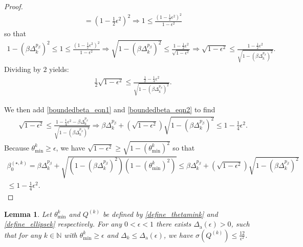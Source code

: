 \documentclass{article}
\newtheorem{lemma}[theorem]{Lemma}
\theoremstyle{case}
\numberwithin{theorem}{subsection}
\newcommand{\bsk}{{\beta_0^{(\star, k)}}}
\newcommand{\dacco}{{\Delta_{\textrm{a}}}}
\newcommand{\dk}{\Delta_k}
\newcommand{\naturals}{\mathbb N}
\newcommand{\qk}{{Q^{(k)}}}
\newcommand{\thetamink}{{\theta^k_{\textrm{min}}}}
\begin{document}
\begin{proof}
\begin{align*}
= \left(1 - \frac 1 2 \epsilon^2 \right)^2 
\Longrightarrow 1 \le \frac{\left(1 - \frac 1 2 \epsilon^2\right)^2}{1 - \epsilon^2}
\end{align*}
so that
\begin{align*}
1 - \left(\beta\dk^{p_{\beta}}\right)^2 \le 1 \le \frac{\left(1 - \frac 1 2 \epsilon^2\right)^2}{1 - \epsilon^2} 
\Longrightarrow \sqrt{1 - \left(\beta\dk^{p_{\beta}}\right)^2}\le \frac{1 - \frac 1 2 \epsilon^2}{\sqrt{1 - \epsilon^2} } 
\Longrightarrow \sqrt{1 - \epsilon^2} \le \frac{1 - \frac 1 2 \epsilon^2}{\sqrt{1 - \left(\beta\dk^{p_{\beta}}\right)^2}}.
\end{align*}
Dividing by $2$ yields:
\begin{align}
\frac 1 2 \sqrt{1 - \epsilon^2} \le \frac{\frac 1 2 - \frac 1 4 \epsilon^2}{\sqrt{1 - \left(\beta\dk^{p_{\beta}}\right)^2}}
\label{boundedbeta_eqn2}.
\end{align}

We then add \cref{boundedbeta_eqn1} and \cref{boundedbeta_eqn2} to find
\begin{align*}
\sqrt{1 - \epsilon^2} \le \frac{1 -  \frac 1 4 \epsilon^2 - \beta\dk^{p_{\beta}}}{\sqrt{1 - \left(\beta\dk^{p_{\beta}}\right)^2}}
\Longrightarrow \beta\dk^{p_{\beta}} + \left(\sqrt{1 - \epsilon^2}\right)\sqrt{1 - \left(\beta\dk^{p_{\beta}}\right)^2} \le 1 -  \frac 1 4 \epsilon^2.
\end{align*}
Because $\thetamink \ge \epsilon$, we have $\sqrt{1 - \epsilon^2} \ge \sqrt{1 - \left(\thetamink\right)^2}$
so that
\begin{align*}
\bsk 
= \beta\dk^{p_{\beta}} + \sqrt{\left(1 - \left(\beta\dk^{p_{\beta}}\right)^2\right)\left(1 - \left(\thetamink\right)^2\right)} 
\le \beta\dk^{p_{\beta}} + \left(\sqrt{1 - \epsilon^2}\right)\sqrt{1 - \left(\beta\dk^{p_{\beta}}\right)^2} \\
\le 1 -  \frac 1 4 \epsilon^2.
\end{align*}
\end{proof}



\begin{lemma}
\label{boundbeta}
Let $\thetamink$ and $\qk$ be defined by \cref{define_thetamink} and \cref{define_ellipsek} respectively.
For any $0 < \epsilon < 1$ there exists $\dacco(\epsilon) > 0$, such that for any $k \in \naturals$ with
$\thetamink \ge \epsilon$ and $\dk \le \dacco(\epsilon)$, we have $\sigma(\qk) \le \frac{12}{\epsilon^2}$.
\end{lemma}
\end{document}
